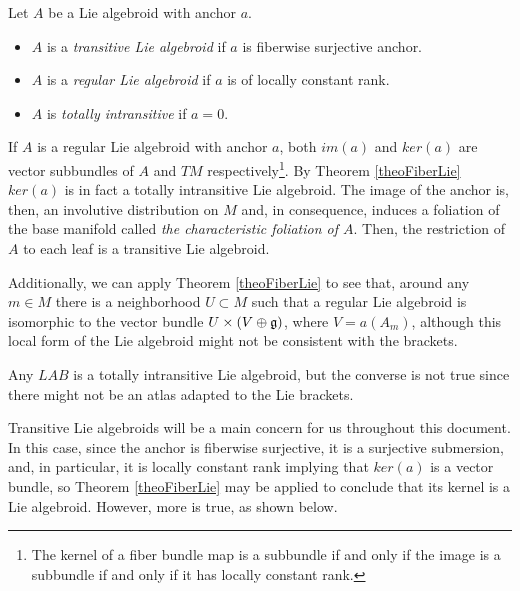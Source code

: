 \begin{definition}
    Let $A$ be a Lie algebroid with anchor $a$.
    
    \begin{itemize}
    
    \item $A$ is a \emph{transitive Lie algebroid} if $a$ is fiberwise surjective anchor.
    
    \item $A$ is a \emph{regular Lie algebroid} if $a$ is of locally constant rank.
    
    \item $A$ is \emph{totally intransitive} if $a = 0$.
    
    \end{itemize}
    
\end{definition}

\begin{remark}
If $A$ is a regular Lie algebroid with anchor $a$, both $im(a)$ and $ker(a)$ are vector subbundles of $A$ and $TM$ respectively\footnote{The kernel of a fiber bundle map is a subbundle if and only if the image is a subbundle if and only if it has locally constant rank.}. By Theorem \ref{theoFiberLie} $ker(a)$ is in fact a totally intransitive Lie algebroid. The image of the anchor is, then, an involutive distribution on $M$ and, in consequence, induces a foliation of the base manifold called \emph{the characteristic foliation of $A$}. Then, the restriction of $A$ to each leaf is a transitive Lie algebroid.

Additionally, we can apply Theorem \ref{theoFiberLie} to see that, around any $m \in M$ there is a neighborhood $U \subset M$ such that a regular Lie algebroid is isomorphic to the vector bundle $U \times (V \oplus \mathfrak{g})$, where $V = a(A_m)$, although this local form of the Lie algebroid might not be consistent with the brackets.%
\end{remark}

\begin{remark}
Any $LAB$ is a totally intransitive Lie algebroid, but the converse is not true since there might not be an atlas adapted to the Lie brackets.
\end{remark}

Transitive Lie algebroids will be a main concern for us throughout this document. In this case, since the anchor is fiberwise surjective,
 it is a surjective submersion, and, in particular, it is locally constant rank implying that $ker(a)$ is a vector bundle, so Theorem \ref{theoFiberLie} may be applied to conclude that its kernel is a Lie algebroid. However, more is true, as shown below.

